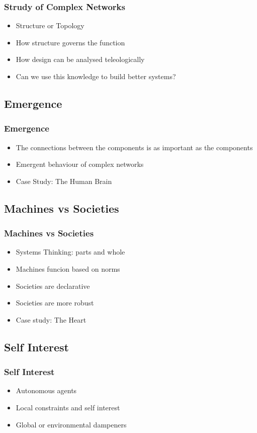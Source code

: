 \documentclass{beamer}
\begin{document}
	\frame
	{
		\frametitle{Strudy of Complex Networks}
			\begin{itemize}
				\item<1-> {Structure or Topology}
				\item<2-> {How structure governs the function}
				\item<3-> {How design can be analysed teleologically}
				\item<4-> {Can we use this knowledge to build better systems?}
			\end{itemize}
	}

	\subsection{Emergence}
		\frame
		{
			\frametitle{Emergence}
			\begin{itemize}
				\item<1-> {The connections between the components is as important as the components}
				\item<2-> {Emergent behaviour of complex networks}
				\item<3-> {Case Study: The Human Brain}
			\end{itemize}
		}

	\subsection{Machines vs Societies}
		\frame
		{
			\frametitle{Machines vs Societies}
				\begin{itemize}
					\item<1-> {Systems Thinking: parts and whole}
					\item<2-> {Machines funcion based on norms}
					\item<3-> {Societies are declarative}
					\item<4-> {Societies are more robust}
					\item<5-> {Case study: The Heart}
				\end{itemize}
		}

	\subsection{Self Interest}
		\frame
		{
			\frametitle{Self Interest}
				\begin{itemize}
					\item<1-> {Autonomous agents}
					\item<2-> {Local constraints and self interest}
					\item<3-> {Global or environmental dampeners}
				\end{itemize}
		}
	
\end{document}
